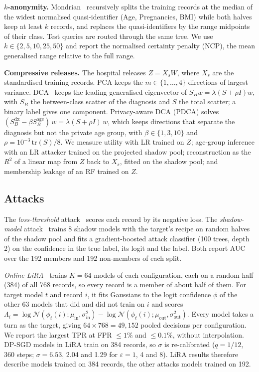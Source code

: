 \documentclass[conference]{IEEEtran}
\newcommand{\eps}{\varepsilon}
\begin{document}
\textbf{$k$-anonymity.} Mondrian~\cite{lefevre2006} recursively splits the training records at the median of the widest normalised quasi-identifier (Age, Pregnancies, BMI) while both halves keep at least $k$ records, and replaces the quasi-identifiers by the range midpoints of their class. Test queries are routed through the same tree. We use $k\in\{2,5,10,25,50\}$ and report the normalised certainty penalty (NCP), the mean generalised range relative to the full range.

\textbf{Compressive releases.} The hospital releases $Z{=}X_sW$, where $X_s$ are the standardised training records. PCA keeps the $m\in\{1,\dots,4\}$ directions of largest variance. DCA~\cite{kung2017dca} keeps the leading generalised eigenvector of $S_B w=\lambda(S+\rho I)w$, with $S_B$ the between-class scatter of the diagnosis and $S$ the total scatter; a binary label gives one component. Privacy-aware DCA (PDCA) solves $(S_B^{\mathrm{dx}}-\beta S_B^{\mathrm{age}})\,w=\lambda(S+\rho I)\,w$, which keeps directions that separate the diagnosis but not the private age group, with $\beta\in\{1,3,10\}$ and $\rho{=}10^{-3}\,\mathrm{tr}(S)/8$. We measure utility with LR trained on $Z$; age-group inference with an LR attacker trained on the projected shadow pool; reconstruction as the $R^2$ of a linear map from $Z$ back to $X_s$, fitted on the shadow pool; and membership leakage of an RF trained on $Z$.

\subsection{Attacks}
The \emph{loss-threshold} attack~\cite{yeom2018} scores each record by its negative loss. The \emph{shadow-model} attack~\cite{shokri2017} trains 8 shadow models with the target's recipe on random halves of the shadow pool and fits a gradient-boosted attack classifier (100 trees, depth 2) on the confidence in the true label, its logit and the label. Both report AUC over the 192 members and 192 non-members of each split.

\emph{Online LiRA}~\cite{carlini2022} trains $K{=}64$ models of each configuration, each on a random half (384) of all 768 records, so every record is a member of about half of them. For target model $t$ and record $i$, it fits Gaussians to the logit confidence $\phi$ of the other 63 models that did and did not train on $i$ and scores $\Lambda_i=\log\mathcal N(\phi_t(i);\mu_{\mathrm{in}},\sigma^2_{\mathrm{in}})-\log\mathcal N(\phi_t(i);\mu_{\mathrm{out}},\sigma^2_{\mathrm{out}})$. Every model takes a turn as the target, giving $64\times768=49{,}152$ pooled decisions per configuration. We report the largest TPR at FPR $\leq1\%$ and $\leq0.1\%$, without interpolation. DP-SGD models in LiRA train on 384 records, so $\sigma$ is re-calibrated ($q{=}1/12$, 360 steps; $\sigma{=}6.53$, 2.04 and 1.29 for $\eps{=}1$, 4 and 8). LiRA results therefore describe models trained on 384 records, the other attacks models trained on 192.
\end{document}
